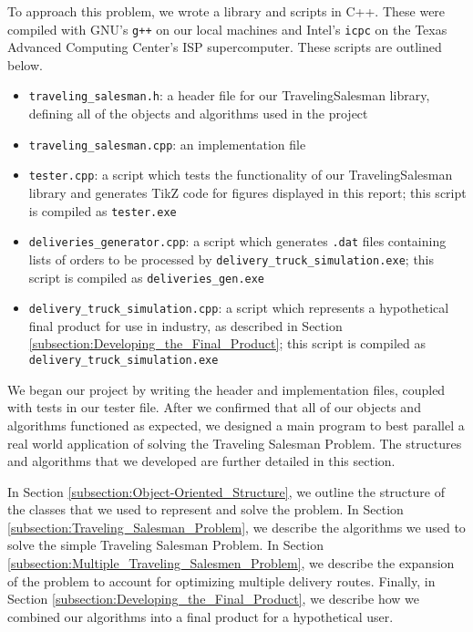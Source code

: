 \documentclass[letterpaper]{article}
\begin{document}
    To approach this problem, we wrote a library and scripts in C++. These were compiled with GNU's \verb|g++| on our local machines and Intel's \verb|icpc| on the Texas Advanced Computing Center's ISP supercomputer. These scripts are outlined below.
    \begin{itemize}
        \item \verb|traveling_salesman.h|: a header file for our TravelingSalesman library, defining all of the objects and algorithms used in the project
        \item \verb|traveling_salesman.cpp|: an implementation file
        \item \verb|tester.cpp|: a script which tests the functionality of our TravelingSalesman library and generates TikZ code for figures displayed in this report; this script is compiled as \verb|tester.exe|
        \item \verb|deliveries_generator.cpp|: a script which generates \verb|.dat| files containing lists of orders to be processed by \verb|delivery_truck_simulation.exe|; this script is compiled as \verb|deliveries_gen.exe|
        \item \verb|delivery_truck_simulation.cpp|: a script which represents a hypothetical final product for use in industry, as described in Section \ref{subsection:Developing_the_Final_Product}; this script is compiled as \verb|delivery_truck_simulation.exe|
    \end{itemize}

    We began our project by writing the header and implementation files, coupled with tests in our tester file. After we confirmed that all of our objects and algorithms functioned as expected, we designed a main program to best parallel a real world application of solving the Traveling Salesman Problem. The structures and algorithms that we developed are further detailed in this section.

    In Section \ref{subsection:Object-Oriented_Structure}, we outline the structure of the classes that we used to represent and solve the problem. In Section \ref{subsection:Traveling_Salesman_Problem}, we describe the algorithms we used to solve the simple Traveling Salesman Problem. In Section \ref{subsection:Multiple_Traveling_Salesmen_Problem}, we describe the expansion of the problem to account for optimizing multiple delivery routes. Finally, in Section \ref{subsection:Developing_the_Final_Product}, we describe how we combined our algorithms into a final product for a hypothetical user.
\end{document}
